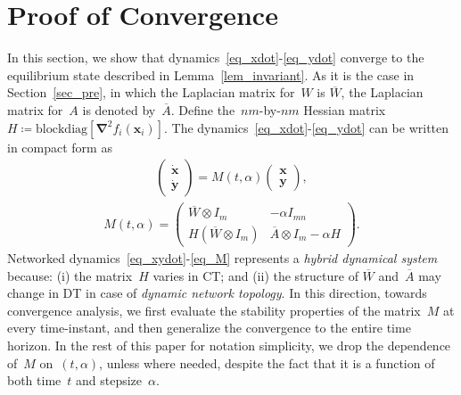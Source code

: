 \documentclass[letterpaper, 10pt, conference]{ieeeconf}
\def\mb{\mathbf}
\begin{document}
\section{Proof of Convergence} \label{sec_conv}
In this section, we show that  dynamics~\eqref{eq_xdot}-\eqref{eq_ydot} converge to the equilibrium state described in Lemma~\ref{lem_invariant}.
As it is the case in Section~\ref{sec_pre}, in which the Laplacian matrix for~$W$ is $\overline{W}$, the Laplacian matrix for~$A$ is denoted by~$\overline{A}$. 
Define the~$nm$-by-$nm$  Hessian matrix~$H\coloneqq\text{blockdiag}[\boldsymbol{ \nabla}^2 f_i(\mb{x}_i)]$.
The dynamics~\eqref{eq_xdot}-\eqref{eq_ydot} can be written in compact form as
\begin{eqnarray} \label{eq_xydot}
	\left(\begin{array}{c} \dot{\mb{x}} \\ \dot{\mb{y}} \end{array} \right) = M (t,\alpha) \left(\begin{array}{c} {\mb{x}} \\ {\mb{y}} \end{array} \right),
\end{eqnarray} 
\begin{eqnarray} \label{eq_M}
M(t,\alpha) = \left(\begin{array}{cc} \overline{W} \otimes I_m & -\alpha I_{mn} \\ H(\overline{W}\otimes I_m) & \overline{A} \otimes I_m - \alpha H
\end{array} \right).
\end{eqnarray}
Networked dynamics~\eqref{eq_xydot}-\eqref{eq_M} represents a \textit{hybrid dynamical system} because: (i) the matrix~$H$ varies in CT; and (ii) the structure of $\overline{W}$ and~$\overline{A}$ may change in DT in case of \textit{dynamic network topology}. In this direction, towards convergence analysis, we first evaluate the stability properties of the matrix~$M$ at every time-instant, and then generalize the convergence to the entire time horizon. In the rest of this paper for notation simplicity, we drop the dependence of~$M$ on~$(t,\alpha)$, unless where needed, despite the fact that it is a function of both time~$t$ and stepsize~$\alpha$. 
\end{document}
